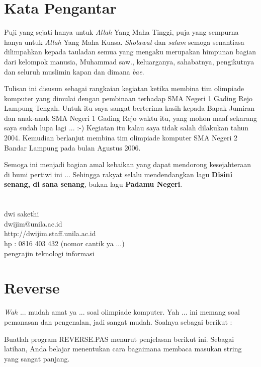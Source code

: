 \documentclass[a4paper,10pt,makeidx]{article}
\begin{document}
\section{Kata Pengantar}
\par
\indent
\indent
{}
Puji yang sejati hanya untuk {\itshape Allah} Yang Maha Tinggi, puja yang sempurna
hanya untuk {\itshape Allah} Yang Maha Kuasa. {\itshape Sholawat} dan {\itshape
salam} semoga senantiasa dilimpahkan kepada tauladan semua yang mengaku
merupakan himpunan bagian dari kelompok manusia,
Muhammad saw., keluarganya, sahabatnya, pengikutnya dan seluruh muslimin kapan
dan dimana {\itshape bae}.
\par
\indent
\indent
Tulisan ini disusun sebagai rangkaian kegiatan ketika membina tim olimpiade
komputer yang dimulai dengan pembinaan terhadap SMA Negeri 1 Gading Rejo
Lampung Tengah. Untuk itu saya sangat berterima kasih kepada Bapak Jumiran
dan anak-anak SMA Negeri 1 Gading Rejo waktu itu, yang mohon maaf sekarang
saya sudah lupa lagi ... :-) Kegiatan itu kalau saya tidak salah dilakukan 
tahun 2004. Kemudian berlanjut membina tim olimpiade komputer SMA Negeri 2
Bandar Lampung pada bulan Agustus 2006.
\par
\indent
\indent
Semoga ini menjadi bagian amal kebaikan yang dapat mendorong kesejahteraan
di bumi pertiwi ini ... Sehingga rakyat selalu mendendangkan lagu {\bfseries
Disini senang, di sana senang}, bukan lagu {\bfseries Padamu Negeri}.\\ \\ \\
dwi sakethi \\
dwijim@unila.ac.id \\
http://dwijim.staff.unila.ac.id \\
hp : 0816 403 432 (nomor cantik ya ...) \\
pengrajin teknologi informasi \\
\newpage
\tableofcontents
\setcounter{page}{1}
\newpage
\section{Reverse}
\par
\indent
\indent
{\itshape Wah} ... mudah amat ya ... soal olimpiade komputer. Yah ... ini 
memang soal pemanasan dan pengenalan, jadi sangat mudah. Soalnya sebagai
berikut : \\
\par
\indent
\indent
Buatlah program REVERSE.PAS menurut penjelasan berikut ini. Sebagai latihan,
Anda belajar menentukan cara bagaimana membaca masukan string yang sangat
panjang.
\end{document}
